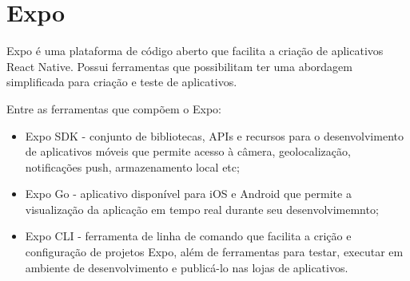 \section{Expo}
\label{sec:Expo}
Expo é uma plataforma de código aberto que facilita a criação de aplicativos React Native. Possui ferramentas que  
possibilitam ter uma abordagem simplificada para criação e teste de aplicativos.

\begin{description}
    \item Entre as ferramentas que compõem o Expo:
          \begin{itemize}
              \item Expo SDK - conjunto de bibliotecas, APIs e recursos para o desenvolvimento de aplicativos móveis que permite acesso 
              à câmera, geolocalização, notificações push, armazenamento local etc;

              \item Expo Go - aplicativo disponível para iOS e Android que permite a visualização da aplicação em tempo real durante seu 
              desenvolvimemnto;

              \item Expo CLI - ferramenta de linha de comando que facilita a crição e configuração de projetos Expo, além de ferramentas para 
              testar, executar em ambiente de desenvolvimento e publicá-lo nas lojas de aplicativos.
          \end{itemize}
\end{description}